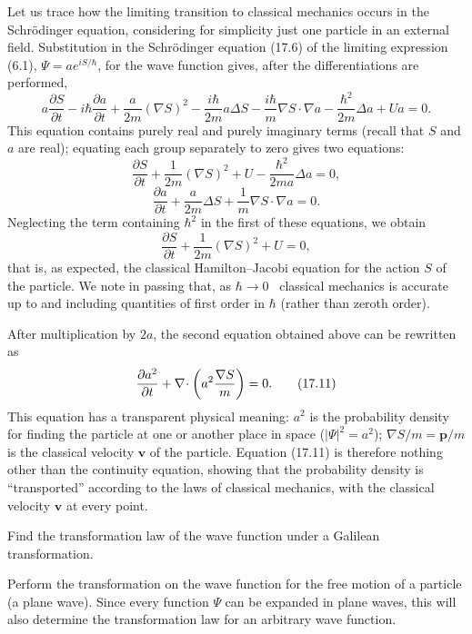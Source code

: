 Let us trace how the limiting transition to classical mechanics occurs in the
Schrödinger equation, considering for simplicity just one particle in an
external field. Substitution in the Schrödinger equation (17.6) of the limiting
expression (6.1), $\Psi=ae^{iS/\hbar}$, for the wave function gives, after the
differentiations are performed,
\[
  a\frac{\partial S}{\partial t}
  -i\hbar\frac{\partial a}{\partial t}
  +\frac{a}{2m}{\left(\nabla S\right)}^2
  -\frac{i\hbar}{2m}a\Delta S
  -\frac{i\hbar}{m}\nabla S\cdot\nabla a
  -\frac{\hbar^2}{2m}\Delta a+Ua=0.
\]
This equation contains purely real and purely imaginary terms (recall that $S$
and $a$ are real); equating each group separately to zero gives two equations:
\[
  \frac{\partial S}{\partial t}
  +\frac{1}{2m}{\left(\nabla S\right)}^2
  +U-\frac{\hbar^2}{2ma}\Delta a=0,
\]
\[
  \frac{\partial a}{\partial t}
  +\frac{a}{2m}\Delta S+\frac{1}{m}\nabla S\cdot\nabla a=0.
\]
Neglecting the term containing $\hbar^2$ in the first of these equations, we
obtain
\begin{equation}
  \frac{\partial S}{\partial t}
  +\frac{1}{2m}{\left(\nabla S\right)}^2+U=0,
  \tag{17.10}
\end{equation}
that is, as expected, the classical Hamilton--Jacobi equation for the action
$S$ of the particle. We note in passing that, as $\hbar\to0$%
\relax\ classical mechanics is accurate up to and including quantities of
first order in $\hbar$ (rather than zeroth order).

After multiplication by $2a$, the second equation obtained above can be
rewritten as
\begin{equation}
  \frac{\partial a^2}{\partial t}
  +\nabla\!\cdot \left(a^2\frac{\nabla S}{m}\right)=0.
  \tag{17.11}
\end{equation}
This equation has a transparent physical meaning: $a^2$ is the probability
density for finding the particle at one or another place in space
($|\Psi|^2=a^2$); $\nabla S/m=\mathbf p/m$ is the classical velocity
$\mathbf v$ of the particle. Equation (17.11) is therefore nothing other than
the continuity equation, showing that the probability density is
``transported'' according to the laws of classical mechanics, with the
classical velocity $\mathbf v$ at every point.

\ProblemHeading
Find the transformation law of the wave function under a Galilean
transformation.

\SolutionHeading
Perform the transformation on the wave function for the free motion of a
particle (a plane wave). Since every function $\Psi$ can be expanded in plane
waves, this will also determine the transformation law for an arbitrary wave
function.

